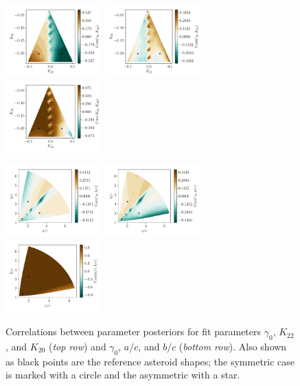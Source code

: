 \documentclass[fleqn,usenatbib]{mnras}
\begin{document}
\begin{figure}
  \includegraphics[width=0.33\textwidth]{figs/probe-space-corr12.pdf}\hfill
  \includegraphics[width=0.33\textwidth]{figs/probe-space-corr13.pdf}\hfill
  \includegraphics[width=0.33\textwidth]{figs/probe-space-corr23.pdf}

  \includegraphics[width=0.33\textwidth]{figs/probe-space-ab-1b.pdf}\hfill
  \includegraphics[width=0.33\textwidth]{figs/probe-space-ab-1a.pdf}\hfill
  \includegraphics[width=0.33\textwidth]{figs/probe-space-ab-ab.pdf}
  
  \caption{Correlations between parameter posteriors for fit parameters $\gamma_0$, $K_{22}$, and $K_{20}$ (\textit{top row}) and $\gamma_0$, $a/c$, and $b/c$ (\textit{bottom row}).  Also shown as black points are the reference asteroid shapes; the symmetric case is marked with a circle and the asymmetric with a star.}
  \label{fig:scan-space-corr}
\end{figure}
\end{document}

